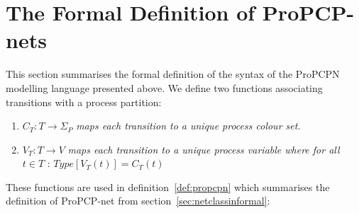 \section{The Formal Definition of ProPCP-nets}
\label{sec:netclassformal}
This section summarises the formal definition of the syntax of the ProPCPN modelling language presented above. We define two functions associating transitions with a process partition:

\begin{enumerate}
\item $C_{T} : T \rightarrow \Sigma_{P}$ \textit{maps each transition to a unique process colour set.}
\item $V_{T} : T \rightarrow V$ \textit{maps each transition to a unique process variable where for all} $t \in T$ : $Type[V_{T}(t)] = C_{T}(t)$
\end{enumerate}

\noindent
These functions are used in definition~\ref{def:propcpn} which summarises the definition of ProPCP-net from section~\ref{sec:netclassinformal}:

